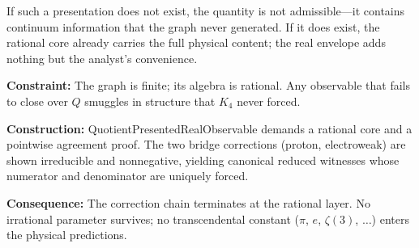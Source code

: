 \documentclass[11pt,a4paper]{book}
\def\mathbb#1{#1}%
\def\texttt#1{#1}%
\begin{document}
If such a presentation does not exist, the quantity is not admissible---it
contains continuum information that the graph never generated.  If it does
exist, the rational core already carries the full physical content; the real
envelope adds nothing but the analyst's convenience.

\medskip
\noindent
\textbf{Constraint:}
The graph is finite; its algebra is rational.  Any observable that fails to
close over $\mathbb{Q}$ smuggles in structure that $K_4$ never forced.

\noindent
\textbf{Construction:}
\texttt{QuotientPresentedRealObservable} demands a rational core and a
pointwise agreement proof.  The two bridge corrections (proton, electroweak)
are shown irreducible and nonnegative, yielding canonical reduced witnesses
whose numerator and denominator are uniquely forced.

\noindent
\textbf{Consequence:}
The correction chain terminates at the rational layer.  No irrational
parameter survives; no transcendental constant ($\pi$, $e$, $\zeta(3)$,
$\ldots$) enters the physical predictions.
\end{document}

